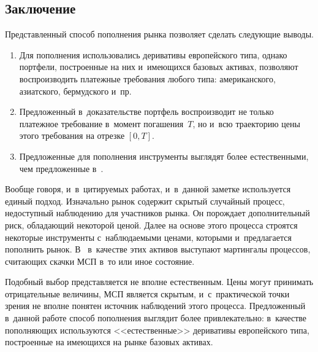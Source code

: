 \begin{multicols}{2}
\section{Заключение}

Представленный способ пополнения рынка позволяет сделать следующие выводы.
\begin{enumerate}[1.]\item 
Для пополнения использовались деривативы европейского типа, однако портфели, построенные на них и~имеющихся базовых активах, 
позволяют воспроизводить платежные требования любого типа: американского, азиатского, бермудского и~пр. 
\item Предложенный в~доказательстве портфель воспроизводит не только платежное требование в~момент погашения~$T$, 
но и~всю траекторию цены этого требования на отрезке $[0,T]$. 
\item Предложенные для пополнения инструменты выглядят более естественными, чем предложенные в~\cite{ZhangElliottSiuGuo_11, Courcuera_05}. 
\end{enumerate}

Вообще говоря, и~в~ци\-ти\-ру\-емых работах, и~в~данной заметке используется единый подход. Изначально рынок содержит скрытый случайный процесс, 
недоступный наблюдению для участников рынка. Он порождает дополнительный риск, обладающий некоторой ценой. Далее на основе 
этого процесса строятся некоторые инструменты с~наблюдаемыми ценами, которыми и~предлагается пополнить рынок. 
В~\cite{ZhangElliottSiuGuo_11, Courcuera_05} в~качестве этих активов выступают мартингалы процессов, считающих 
скачки МСП в~то или иное состояние. 

Подобный выбор пред\-став\-ля\-ет\-ся не вполне естественным. Цены могут принимать отрицательные величины, 
МСП является скрытым, и~с~практической точки зрения не вполне понятен источник наблюдений этого процесса. 
Предложенный в~данной работе способ пополнения выглядит более привлекательно: в~качестве пополняющих используются <<естественные>> 
деривативы европейского типа, по\-стро\-ен\-ные на име\-ющих\-ся на рынке базовых активах.
{ %

}


\end{multicols}
